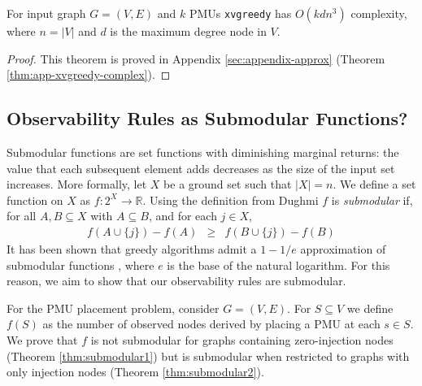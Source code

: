 
\begin{theorem}
For input graph $G=(V,E)$ and $k$ PMUs {\tt xvgreedy} has $O(kdn^3)$ complexity, where $n=|V|$ and $d$ is the maximum degree node in $V$.
\label{thm:xvgreedy-complex}
\end{theorem}
\begin{proof}
This theorem is proved in Appendix \ref{sec:appendix-approx} (Theorem \ref{thm:app-xvgreedy-complex}).
\end{proof}


\subsection{Observability Rules as Submodular Functions?}
\label{subsec:submodular}

Submodular functions are set functions with diminishing marginal returns: the value that each subsequent element adds decreases as the size of the input set increases. 
More formally, let $X$ be a ground set such that $|X|=n$. We define a set function on $X$ as $f: 2^X \rightarrow \mathbb{R}$.
Using the definition from Dughmi \cite{Dughmi09} %
$f$ is \emph{submodular} if, for all $A,B \subseteq X$ with $A \subseteq B$, and for each $j \in X$,
\begin{eqnarray}
f(A \cup \{j\}) - f(A) &\geq& f(B \cup \{j\}) - f(B)
\end{eqnarray}
It has been shown that greedy algorithms admit a $1-1/e$ approximation of submodular functions \cite{Nem78}, where $e$ is the base of the natural logarithm. For this reason,
we aim to show that our observability rules are submodular.

For the PMU placement problem, consider $G=(V,E)$.  For $S \subseteq V$ we define $f(S)$ as the number of observed nodes derived by placing a PMU at each $s \in S$.  
We prove that $f$ is not submodular for graphs containing zero-injection nodes (Theorem \ref{thm:submodular1}) but is submodular when restricted
to graphs with only injection nodes (Theorem \ref{thm:submodular2}).  


